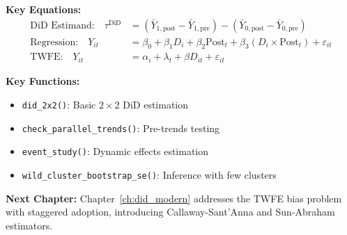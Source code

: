 \textbf{Key Equations:}
\begin{align}
\text{DiD Estimand:} \quad \tau^{\text{DiD}} &= (\bar{Y}_{1,\text{post}} - \bar{Y}_{1,\text{pre}}) - (\bar{Y}_{0,\text{post}} - \bar{Y}_{0,\text{pre}}) \\
\text{Regression:} \quad Y_{it} &= \beta_0 + \beta_1 D_i + \beta_2 \text{Post}_t + \beta_3 (D_i \times \text{Post}_t) + \varepsilon_{it} \\
\text{TWFE:} \quad Y_{it} &= \alpha_i + \lambda_t + \beta D_{it} + \varepsilon_{it}
\end{align}

\textbf{Key Functions:}
\begin{itemize}
    \item \texttt{did\_2x2()}: Basic $2 \times 2$ DiD estimation
    \item \texttt{check\_parallel\_trends()}: Pre-trends testing
    \item \texttt{event\_study()}: Dynamic effects estimation
    \item \texttt{wild\_cluster\_bootstrap\_se()}: Inference with few clusters
\end{itemize}

\textbf{Next Chapter:} Chapter~\ref{ch:did_modern} addresses the TWFE bias problem with staggered adoption, introducing Callaway-Sant'Anna and Sun-Abraham estimators.

